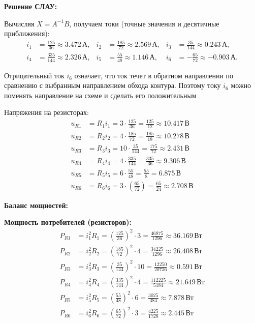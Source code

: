 \textbf{Решение СЛАУ:}

Вычисляя $X = A^{-1}B$, получаем токи (точные значения и десятичные приближения):
\[
\begin{aligned}
 i_1 &= \tfrac{125}{36} \approx 3.472\,\text{А}, &
 i_2 &= \tfrac{185}{72} \approx 2.569\,\text{А}, &
 i_3 &= \tfrac{35}{144} \approx 0.243\,\text{А}, \\
 i_4 &= \tfrac{335}{144} \approx 2.326\,\text{А}, &
 i_5 &= \tfrac{55}{48} \approx 1.146\,\text{А}, &
 i_6 &= -\tfrac{65}{72} \approx -0.903\,\text{А}.
\end{aligned}
\]

Отрицательный ток $i_6$ означает, что ток течет в обратном направлении по сравнению с выбранным направлением обхода контура. Поэтому току $i_6$ можно поменять направление на схеме и сделать его положительным 

Напряжения на резисторах:
\begin{align*}
u_{R1} &= R_1 i_1 = 3\cdot\tfrac{125}{36} = \tfrac{125}{12} \approx 10.417\,\text{В} \\
u_{R2} &= R_2 i_2 = 4\cdot\tfrac{185}{72} = \tfrac{185}{18} \approx 10.278\,\text{В} \\
u_{R3} &= R_3 i_3 = 10\cdot\tfrac{35}{144} = \tfrac{175}{72} \approx 2.431\,\text{В} \\
u_{R4} &= R_4 i_4 = 4\cdot\tfrac{335}{144} = \tfrac{335}{36} \approx 9.306\,\text{В} \\
u_{R5} &= R_5 i_5 = 6\cdot\tfrac{55}{48} = \tfrac{55}{8} = 6.875\,\text{В} \\
u_{R6} &= R_6 i_6 = 3\cdot\left(\tfrac{65}{72}\right) = \tfrac{65}{24} \approx 2.708\,\text{В}
\end{align*}

\textbf{Баланс мощностей:}

\textbf{Мощность потребителей (резисторов):}
\begin{align*}
P_{R1} &= i_1^2 R_1 = \left(\tfrac{125}{36}\right)^2\!\cdot 3 = \tfrac{46875}{1296} \approx 36.169\,\text{Вт} \\
P_{R2} &= i_2^2 R_2 = \left(\tfrac{185}{72}\right)^2\!\cdot 4 = \tfrac{34225}{1296} \approx 26.408\,\text{Вт} \\
P_{R3} &= i_3^2 R_3 = \left(\tfrac{35}{144}\right)^2\!\cdot 10 = \tfrac{12250}{20736} \approx 0.591\,\text{Вт} \\
P_{R4} &= i_4^2 R_4 = \left(\tfrac{335}{144}\right)^2\!\cdot 4 = \tfrac{112225}{5184} \approx 21.649\,\text{Вт} \\
P_{R5} &= i_5^2 R_5 = \left(\tfrac{55}{48}\right)^2\!\cdot 6 = \tfrac{3025}{384} \approx 7.878\,\text{Вт} \\
P_{R6} &= i_6^2 R_6 = \left(\tfrac{65}{72}\right)^2\!\cdot 3 = \tfrac{4225}{1728} \approx 2.445\,\text{Вт}
\end{align*}

